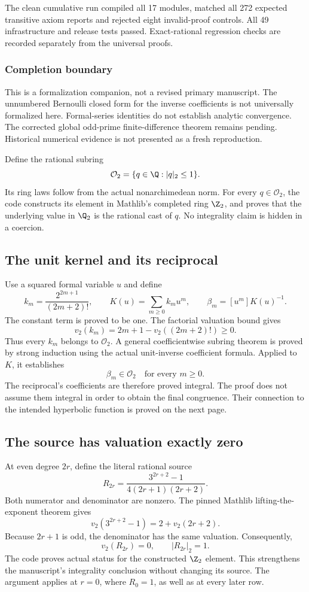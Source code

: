 The clean cumulative run compiled all 17 modules, matched all 272 expected transitive axiom reports and rejected eight invalid-proof controls. All 49 infrastructure and release tests passed. Exact-rational regression checks are recorded separately from the universal proofs.

\subsubsection*{Completion boundary}
This is a formalization companion, not a revised primary manuscript. The unnumbered Bernoulli closed form for the inverse coefficients is not universally formalized here. Formal-series identities do not establish analytic convergence. The corrected global odd-prime finite-difference theorem remains pending. Historical numerical evidence is not presented as a fresh reproduction.
\par\medskip
{}
Define the rational subring
\[
 \mathcal O_2=\{q\in\Q:|q|_2\leq1\}.
\]
Its ring laws follow from the actual nonarchimedean norm. For every $q\in\mathcal O_2$, the code constructs its element in Mathlib's completed ring $\Z_2$, and proves that the underlying value in $\Q_2$ is the rational cast of $q$. No integrality claim is hidden in a coercion.

\subsection*{The unit kernel and its reciprocal}
Use a squared formal variable $u$ and define
\[
 k_m=\frac{2^{2m+1}}{(2m+2)!},\qquad
 K(u)=\sum_{m\geq0}k_mu^m,\qquad
 \beta_m=[u^m]K(u)^{-1}.
\]
The constant term is proved to be one. The factorial valuation bound gives
\[
 v_2(k_m)=2m+1-v_2((2m+2)!)\geq0.
\]
Thus every $k_m$ belongs to $\mathcal O_2$. A general coefficientwise subring theorem is proved by strong induction using the actual unit-inverse coefficient formula. Applied to $K$, it establishes
\[
 \boxed{\beta_m\in\mathcal O_2\quad\text{for every }m\geq0.}
\]
The reciprocal's coefficients are therefore proved integral. The proof does not assume them integral in order to obtain the final congruence. Their connection to the intended hyperbolic function is proved on the next page.

\subsection*{The source has valuation exactly zero}
At even degree $2r$, define the literal rational source
\[
 R_{2r}=\frac{3^{2r+2}-1}{4(2r+1)(2r+2)}.
\]
Both numerator and denominator are nonzero. The pinned Mathlib lifting-the-exponent theorem gives
\[
 v_2(3^{2r+2}-1)=2+v_2(2r+2).
\]
Because $2r+1$ is odd, the denominator has the same valuation. Consequently,
\[
 \boxed{v_2(R_{2r})=0,\qquad |R_{2r}|_2=1.}
\]
The code proves actual  status for the constructed $\Z_2$ element. This strengthens the manuscript's integrality conclusion without changing its source. The argument applies at $r=0$, where $R_0=1$, as well as at every later row.

